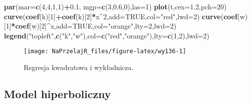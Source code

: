 \documentclass[polish,]{book}
\newenvironment{Shaded}{\begin{snugshade}}{\end{snugshade}}
\newcommand{\DataTypeTok}[1]{\textcolor[rgb]{0.13,0.29,0.53}{#1}}
\newcommand{\DecValTok}[1]{\textcolor[rgb]{0.00,0.00,0.81}{#1}}
\newcommand{\FloatTok}[1]{\textcolor[rgb]{0.00,0.00,0.81}{#1}}
\newcommand{\KeywordTok}[1]{\textcolor[rgb]{0.13,0.29,0.53}{\textbf{#1}}}
\newcommand{\NormalTok}[1]{#1}
\newcommand{\OperatorTok}[1]{\textcolor[rgb]{0.81,0.36,0.00}{\textbf{#1}}}
\newcommand{\OtherTok}[1]{\textcolor[rgb]{0.56,0.35,0.01}{#1}}
\newcommand{\StringTok}[1]{\textcolor[rgb]{0.31,0.60,0.02}{#1}}
\begin{document}
\begin{Shaded}
\begin{Highlighting}[]
\KeywordTok{par}\NormalTok{(}\DataTypeTok{mar=}\KeywordTok{c}\NormalTok{(}\DecValTok{4}\NormalTok{,}\DecValTok{4}\NormalTok{,}\DecValTok{1}\NormalTok{,}\DecValTok{1}\NormalTok{)}\OperatorTok{+}\FloatTok{0.1}\NormalTok{, }\DataTypeTok{mgp=}\KeywordTok{c}\NormalTok{(}\DecValTok{3}\NormalTok{,}\FloatTok{0.6}\NormalTok{,}\DecValTok{0}\NormalTok{),}\DataTypeTok{las=}\DecValTok{1}\NormalTok{)}
\KeywordTok{plot}\NormalTok{(t,}\DataTypeTok{cex=}\FloatTok{1.2}\NormalTok{,}\DataTypeTok{pch=}\DecValTok{20}\NormalTok{)}
\KeywordTok{curve}\NormalTok{(}\KeywordTok{coef}\NormalTok{(k)[}\DecValTok{1}\NormalTok{]}\OperatorTok{+}\KeywordTok{coef}\NormalTok{(k)[}\DecValTok{2}\NormalTok{]}\OperatorTok{*}\NormalTok{x}\OperatorTok{^}\DecValTok{2}\NormalTok{,}\DataTypeTok{add=}\OtherTok{TRUE}\NormalTok{,}\DataTypeTok{col=}\StringTok{"red"}\NormalTok{,}\DataTypeTok{lwd=}\DecValTok{2}\NormalTok{)}
\KeywordTok{curve}\NormalTok{(}\KeywordTok{coef}\NormalTok{(w)[}\DecValTok{1}\NormalTok{]}\OperatorTok{*}\KeywordTok{coef}\NormalTok{(w)[}\DecValTok{2}\NormalTok{]}\OperatorTok{^}\NormalTok{x,}\DataTypeTok{add=}\OtherTok{TRUE}\NormalTok{,}\DataTypeTok{col=}\StringTok{"orange"}\NormalTok{,}\DataTypeTok{lty=}\DecValTok{2}\NormalTok{,}\DataTypeTok{lwd=}\DecValTok{2}\NormalTok{)}
\KeywordTok{legend}\NormalTok{(}\StringTok{"topleft"}\NormalTok{,}\KeywordTok{c}\NormalTok{(}\StringTok{"k"}\NormalTok{,}\StringTok{"w"}\NormalTok{),}\DataTypeTok{col=}\KeywordTok{c}\NormalTok{(}\StringTok{"red"}\NormalTok{,}\StringTok{"orange"}\NormalTok{),}\DataTypeTok{lty=}\KeywordTok{c}\NormalTok{(}\DecValTok{1}\NormalTok{,}\DecValTok{2}\NormalTok{),}\DataTypeTok{lwd=}\DecValTok{2}\NormalTok{)}
\end{Highlighting}
\end{Shaded}

\begin{figure}[h]

{\centering \texttt{[image: NaPrzelajR\_files/figure-latex/wy136-1]} 

}

\caption{Regresja kwadratowa i wykładnicza.}\label{fig:wy136}
\end{figure}

\hypertarget{part_13.3.3}{%
\subsection{Model hiperboliczny}\label{part_13.3.3}}
\end{document}
